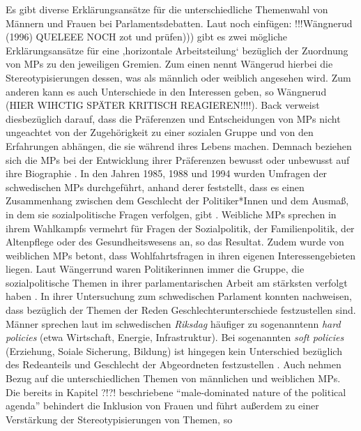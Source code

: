 \documentclass[12pt, 
    twoside=false, 
    bibliography=totoc, 
    numbers=endperiod, 
    headings=normal, 
    toc=chapterentrydotfill
    ]{scrbook}
\begin{document}
Es gibt diverse Erklärungsansätze für die unterschiedliche Themenwahl von Männern und Frauen bei Parlamentsdebatten. Laut \textcite[]{} noch einfügen: !!!Wängnerud (1996)  QUELEEE NOCH zot  und prüfen))) gibt es zwei mögliche Erklärungsansätze für eine ‚horizontale Arbeitsteilung‘ bezüglich der Zuordnung von MPs zu den jeweiligen Gremien. Zum einen nennt Wängerud hierbei die Stereotypisierungen dessen, was als männlich oder weiblich angesehen wird. Zum anderen kann es auch Unterschiede in den Interessen geben, so Wängnerud (HIER WIHCTIG SPÄTER KRITISCH REAGIEREN!!!!). Back verweist diesbezüglich darauf, dass die Präferenzen  und Entscheidungen von MPs nicht ungeachtet von der Zugehörigkeit zu einer sozialen Gruppe und von den Erfahrungen abhängen, die sie während ihres Lebens machen. Demnach beziehen sich die MPs bei der Entwicklung ihrer Präferenzen bewusst oder unbewusst auf ihre Biographie \parencite[507]{back_2014}. 
In den Jahren 1985, 1988 und 1994 wurden Umfragen der schwedischen MPs durchgeführt, anhand derer \textcite[81]{wangnerud_2000}  feststellt, dass es einen Zusammenhang zwischen dem Geschlecht der Politiker*Innen und dem Ausmaß, in dem sie sozialpolitische Fragen verfolgen, gibt \parencites[506]{back_2014}[82]{wangnerud_2000}. Weibliche MPs sprechen in ihrem Wahlkampfs vermehrt für Fragen der Sozialpolitik, der Familienpolitik, der Altenpflege oder des Gesundheitswesens an, so das Resultat. Zudem wurde von weiblichen MPs betont, dass Wohlfahrtsfragen in ihren eigenen Interessengebieten liegen. Laut Wängerrund waren Politikerinnen immer die Gruppe, die sozialpolitische Themen in ihrer parlamentarischen Arbeit am stärksten verfolgt haben \parencites[507]{back_2014}[82]{wangnerud_2000}.
In ihrer Untersuchung zum schwedischen Parlament konnten \textcite{back_2014}  nachweisen, dass bezüglich der Themen der Reden Geschlechterunterschiede festzustellen sind. Männer sprechen laut \textcite{back_2014} im schwedischen \emph{Riksdag} häufiger zu sogenanntenn \emph{hard policies} (etwa Wirtschaft, Energie, Infrastruktur). Bei sogenannten \emph{soft policies} (Erziehung, Soiale Sicherung, Bildung) ist hingegen kein Unterschied bezüglich des Redeanteils und Geschlecht der Abgeordneten festzustellen \parencite[514f.]{back_2014}. 
Auch \textcite{celis_2018} nehmen Bezug auf die unterschiedlichen Themen von männlichen und weiblichen MPs. Die bereits in Kapitel ?!?! beschriebene “male-dominated nature of the political agenda” \parencite[151]{celis_2018} behindert die Inklusion von Frauen und führt außerdem zu einer Verstärkung der Stereotypisierungen von Themen, so \textcite{celis_2018} 
\end{document}
